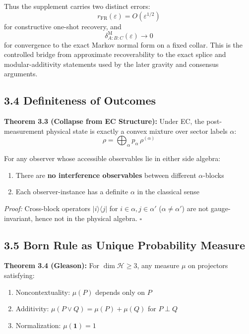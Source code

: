 Thus the supplement carries two distinct errors:
\[
r_{\mathrm{FR}}(\varepsilon)=O(\varepsilon^{1/2})
\]
for constructive one-shot recovery, and
\[
\delta^{\mathrm M}_{A:B:C}(\varepsilon)\to0
\]
for convergence to the exact Markov normal form on a fixed collar. This is the controlled bridge from approximate recoverability to the exact splice and modular-additivity statements used by the later gravity and consensus arguments.

\subsection{3.4 Definiteness of Outcomes}\label{34-definiteness-of-outcomes}

\textbf{Theorem 3.3 (Collapse from EC Structure):} Under EC, the post-measurement physical state is exactly a convex mixture over sector labels \(\alpha\): \[\rho = \bigoplus_\alpha p_\alpha \, \rho^{(\alpha)}\]

For any observer whose accessible observables lie in either side algebra:

\begin{enumerate}
\def\labelenumi{\arabic{enumi}.}
\tightlist
\item
  There are \textbf{no interference observables} between different \(\alpha\)-blocks
\item
  Each observer-instance has a definite \(\alpha\) in the classical sense
\end{enumerate}

\emph{Proof:} Cross-block operators \(|i\rangle\langle j|\) for \(i \in \alpha, j \in \alpha'\) (\(\alpha \neq \alpha'\)) are not gauge-invariant, hence not in the physical algebra. \(\square\)

\subsection{3.5 Born Rule as Unique Probability Measure}\label{35-born-rule-as-unique-probability-measure}

\textbf{Theorem 3.4 (Gleason):} For \(\dim \mathcal{H} \geq 3\), any measure \(\mu\) on projectors satisfying:

\begin{enumerate}
\def\labelenumi{\arabic{enumi}.}
\tightlist
\item
  Noncontextuality: \(\mu(P)\) depends only on \(P\)
\item
  Additivity: \(\mu(P \vee Q) = \mu(P) + \mu(Q)\) for \(P \perp Q\)
\item
  Normalization: \(\mu(\mathbf{1}) = 1\)
\end{enumerate}


